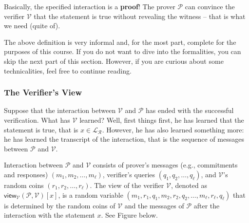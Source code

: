 \documentclass[../lecture-notes-148x210.tex]{subfiles}
\begin{document}
\vspace{-1mm}

Basically, the specified interaction is a \textbf{proof}! The prover $\mathcal{P}$ can convince the verifier $\mathcal{V}$ that the statement is true without revealing the witness -- that is what we need (quite of).

\vspace{-1mm}

\begin{remark}
    The above definition is very informal and, for the most part, complete for the purposes of this course. If you do not want to dive into the formalities, you can skip the next part of this section. However, if you are curious about some technicalities, feel free to continue reading.
\end{remark}

\subsubsection{The Verifier's View}
Suppose that the interaction between $\mathcal{V}$ and $\mathcal{P}$ has ended with the successful verification. What has $\mathcal{V}$ learned? Well, first things first, he has learned that the statement is true, that is $x \in \mathcal{L}_{\mathcal{R}}$. However, he has also learned something more: he has learned the transcript of the interaction, that is the sequence of messages between $\mathcal{P}$ and $\mathcal{V}$.

\vspace{-1mm}

\begin{definition}
    Interaction between $\mathcal{P}$ and $\mathcal{V}$ consists of prover's messages (e.g., commitments and responses) $(m_1,m_2,\dots,m_{\ell})$, verifier's queries $(q_1,q_2,\dots,q_{\ell})$, and $\mathcal{V}$'s random coins $(r_1,r_2,\dots,r_{\ell})$. The view of the verifier $\mathcal{V}$, denoted as $\mathsf{view}_{\mathcal{V}}(\mathcal{P},\mathcal{V})[x]$, is a random variable $(m_1,r_1,q_1,m_2,r_2,q_2,\dots,m_{\ell},r_{\ell},q_{\ell})$ that is determined by the random coins of $\mathcal{V}$ and the messages of $\mathcal{P}$ after the interaction with the statement $x$. See Figure below.
\end{definition}

\vspace{-3mm}
\end{document}
